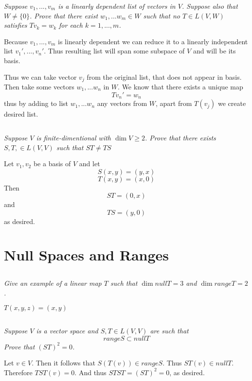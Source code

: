 \documentclass[11pt,oneside,titlepage]{book}
\begin{document}
\textit{Suppose $v_1, ..., v_m$ is a linearly dependent list of vectors in $V$. Suppose
  also that $W \neq \{0\}$. Prove that there exist $w_1, ... w_m \in W$ such that no
  $T \in L(V, W)$ satisfies $Tv_k = w_k$ for each $k = 1, ..., m$.}

Because $v_1, ..., v_m$ is linearly dependent we can reduce it to a linearly independent list
$v_1', ..., v_n'$. Thus resulting list will span some subspace of $V$ and will be its basis.

Thus we can take vector $v_j$ from the original list,
that does not appear in basis.
Then take some vectors $w_1, ... w_n$ in $W$. We know that there exists a unique map
$$Tv_n' = w_n$$
thus by adding to list $w_1, ... w_n$ any vectors from $W$, apart from $T(v_j)$ we create desired
list.

\subsection{}
\textit{Suppose $V$ is finite-dimentional with $\dim V \geq 2$. Prove that there
  exists $S, T, \in L(V, V)$ such that $ST \neq TS$ }

Let $v_1, v_2$ be a basis of $V$ and let
$$ S(x, y) = (y, x)$$
$$ T(x, y) = (x, 0)$$
Then
$$ST = (0, x)$$
and
$$TS = (y, 0)$$
as desired.


\section{Null Spaces and Ranges}

\subsection{}

\textit{Give an example of a linear map $T$ such that $\dim null T = 3$ and
  $\dim range T = 2$.}

$T(x, y, z) = (x, y)$

\subsection{}

\textit{Suppose $V$ is a vector space and $S, T \in L(V, V)$ are such that }
$$range S \subset null T$$
\textit{Prove that $(ST)^2 = 0$.}

Let $v \in V$. Then it follows that $S(T(v)) \in range S$. Thus $ST(v) \in null T$.
Therefore $TST(v) = 0$. And thus  $STST = (ST)^2 = 0$, as desired.
\end{document}
